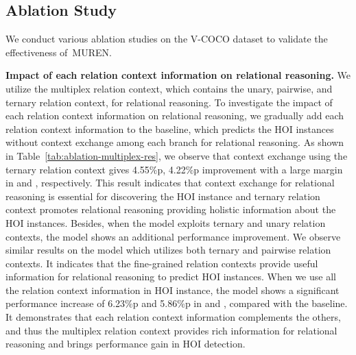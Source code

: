 \documentclass[10pt,twocolumn,letterpaper]{article}
\begin{document}
\vspace{-1.5mm}
\subsection{Ablation Study}
We conduct various ablation studies on the V-COCO dataset to validate the effectiveness of~MUREN.

\noindent
\textbf{Impact of each relation context information on relational reasoning.}
We utilize the multiplex relation context, which contains the unary, pairwise, and ternary relation context, for relational reasoning.
To investigate the impact of each relation context information on relational reasoning, 
we gradually add each relation context information to the baseline, which predicts the HOI instances without context exchange among each branch for relational reasoning.
As shown in Table~\ref{tab:ablation-multiplex-res}, we observe that context exchange using the ternary relation context gives 4.55\%p, 4.22\%p improvement with a large margin in  and , respectively.
This result indicates that context exchange for relational reasoning is essential for discovering the HOI instance and ternary relation context promotes relational reasoning providing holistic information about the HOI instances.
Besides, when the model exploits ternary and unary relation contexts, the model shows an additional performance improvement.
We observe similar results on the model which utilizes both ternary and pairwise relation contexts.
It indicates that the fine-grained relation contexts provide useful information for relational reasoning to predict HOI instances.
When we use all the relation context information in HOI instance, the model shows a significant performance increase of 6.23\%p and 5.86\%p in  and , compared with the baseline.
It demonstrates that each relation context information complements the others, and thus the multiplex relation context provides rich information for relational reasoning and brings performance gain in HOI detection.
\end{document}
